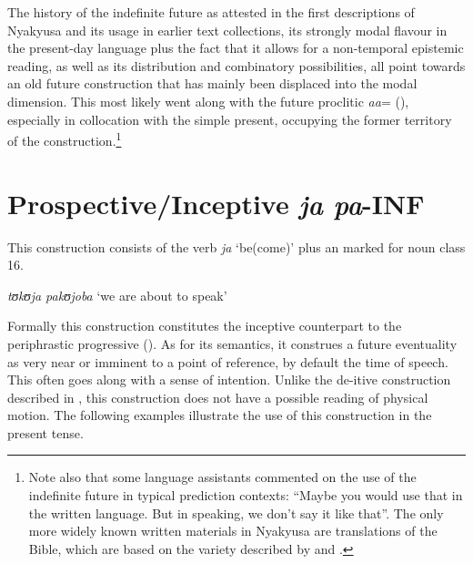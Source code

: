 The history of the indefinite future as attested in the first descriptions of Nyakyusa and its usage in earlier text collections, its strongly modal flavour in the present-day language plus the fact that it allows for a non-temporal epistemic reading, as well as its distribution and combinatory possibilities, all point towards an old future construction that has mainly been displaced into the modal dimension. This most likely went along with the future proclitic \textit{aa}= (), especially in collocation with the simple present, occupying the former territory of the construction.\footnote{Note also that some language assistants commented on the use of the indefinite future in typical prediction contexts: ``Maybe you would use that in the written language. But in speaking, we don't say it like that''. The only more widely known written materials in Nyakyusa are translations of the Bible, which are based on the variety described by \citet{SchumannK1899} and \citet{EndemannC1914}.}
\section{Prospective/Inceptive \textit{ja pa}-INF}\label{ProspectiveKujapa}%
This construction consists of the  verb \textit{ja} \lq be(come)' plus an  marked for  noun class 16.

\begin{exe}
\ex \textit{tʊkʊja pakʊjoba} \lq we are about to speak'
\end{exe}

Formally this construction constitutes the inceptive counterpart to the periphrastic progressive (). As for its semantics, it construes a future eventuality as very near or imminent to a point of reference, by default the time of speech. This often goes along with a sense of intention. Unlike the de-itive construction described in , this construction does not have a possible reading of physical motion. The following examples illustrate the use of this construction in the present tense.

